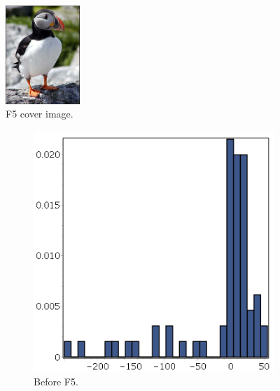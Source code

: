 \begin{figure}
	\centering
	\includegraphics[width=0.25\textwidth]{figures/puffin.jpg}
	\caption{F5 cover image.}
	\label{fig:puffin}
\end{figure}

\begin{figure}
    \centering
    \begin{subfigure}[b]{0.45\textwidth}
        \includegraphics[width=\textwidth]{figures/inputF5.png}
		\caption{Before F5.}
		\label{fig:InputF5}
    \end{subfigure}
    ~ %
    \begin{subfigure}[b]{0.45\textwidth}

\end{subfigure}
\end{figure}
